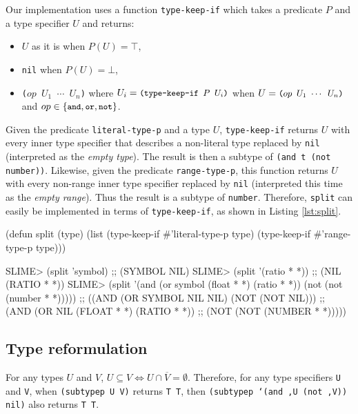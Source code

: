 \documentclass[format=sigconf]{acmart}
\newcommand\code[2][\small]{\sloppy\texttt{#1#2}}
\newcommand\mcode[2][\small]{\text{\code[#1]{#2}}}
\theoremstyle{definition}
\begin{document}
Our implementation uses a function \code{type-keep-if} which takes a predicate
$P$ and a type specifier $U$ and returns:
\begin{itemize}
\item $U$ as it is when $P(U) = \top$,
\item \code{nil} when $P(U) = \bot$,
\item \code{($op$ $U_1$ $\cdots$ $U_n$)}
  where \(U_i = \mcode{(type-keep-if $P$ $U_i$)}\)
  when \(U = \mcode{($op$ $U_1$ $\cdots$ $U_n$)}\)
  and $op \in \{\mcode{and}, \mcode{or}, \mcode{not}\}$.
\end{itemize}
Given the predicate \code{literal-type-p} and a type $U$, \code{type-keep-if}
returns $U$ with every inner type specifier that describes a non-literal type
replaced by \code{nil} (interpreted as the \textit{empty type}). The result is then a
subtype of \code{(and t (not number))}.
Likewise, given the predicate \code{range-type-p}, this function returns $U$
with every non-range inner type specifier replaced by \code{nil} (interpreted
this time as the \textit{empty range}). Thus the result is a subtype of \code{number}.
Therefore, \code{split} can easily be implemented in terms of
\code{type-keep-if}, as shown in Listing \ref{lst:split}.

\begin{listing}
\begin{clcode}
(defun split (type)
  (list (type-keep-if #'literal-type-p type)
        (type-keep-if #'range-type-p type)))
\end{clcode}
\medskip
\begin{clcode}
SLIME> (split 'symbol)
;; (SYMBOL NIL)
SLIME> (split '(ratio * *))
;; (NIL (RATIO * *))
SLIME> (split  '(and (or symbol (float * *) (ratio * *))
                     (not (not (number * *)))))
;; ((AND (OR SYMBOL NIL NIL) (NOT (NOT NIL)))
;;  (AND (OR NIL (FLOAT * *) (RATIO * *))
;;       (NOT (NOT (NUMBER * *)))))
\end{clcode}
\caption{The \code{split} function}
\label{lst:split}
\end{listing}

\subsection{Type reformulation}
For any types $U$ and $V$,
\(U \subseteq V \Leftrightarrow U \cap \overline{V} = \emptyset\).
Therefore, for any type specifiers \code{U} and \code{V}, when
\code{(subtypep U V)} returns \code{T T}, then
\code{(subtypep `(and ,U (not ,V)) nil)} also returns \code{T T}.
\end{document}
